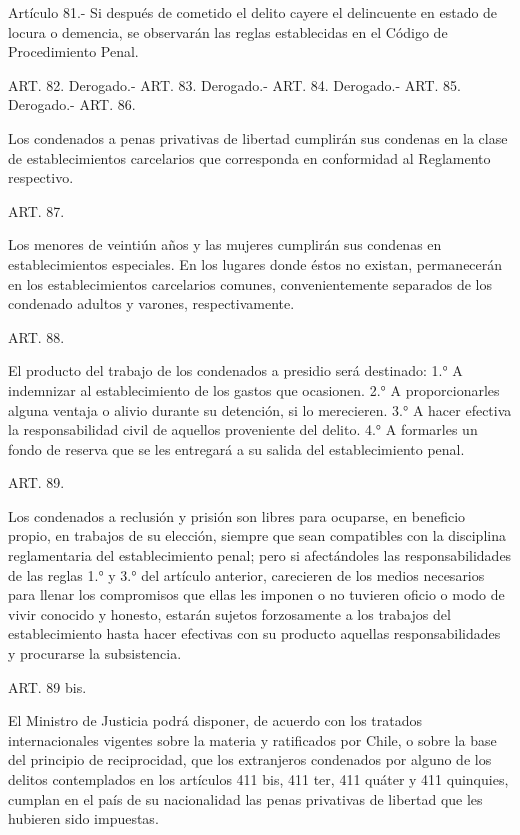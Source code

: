     Artículo 81.- Si después de cometido el delito cayere el delincuente en estado de locura o demencia, se observarán las reglas establecidas en el Código de Procedimiento Penal.



    ART. 82. Derogado.-
    ART. 83. Derogado.-
    ART. 84. Derogado.-
    ART. 85. Derogado.-
    ART. 86.

    Los condenados a penas privativas de libertad cumplirán sus condenas en la clase de establecimientos carcelarios que corresponda en conformidad al Reglamento respectivo.

    ART. 87.

    Los menores de veintiún años y las mujeres cumplirán sus condenas en establecimientos especiales. En los lugares donde éstos no existan, permanecerán en los establecimientos carcelarios comunes, convenientemente separados de los condenado adultos y varones, respectivamente.



    ART. 88.

    El producto del trabajo de los condenados a presidio será destinado:
    1.° A indemnizar al establecimiento de los gastos que ocasionen.
    2.° A proporcionarles alguna ventaja o alivio durante su detención, si lo merecieren.
    3.° A hacer efectiva la responsabilidad civil de aquellos proveniente del delito.
    4.° A formarles un fondo de reserva que se les entregará a su salida del establecimiento penal.



    ART. 89.

    Los condenados a reclusión y prisión son libres para ocuparse, en beneficio propio, en trabajos de su elección, siempre que sean compatibles con la disciplina reglamentaria del establecimiento penal; pero si afectándoles las responsabilidades de las reglas 1.° y 3.° del artículo anterior, carecieren de los medios necesarios para llenar los compromisos que ellas les imponen o no tuvieren oficio o modo de vivir conocido y honesto, estarán sujetos forzosamente a los trabajos del establecimiento hasta hacer efectivas con su producto aquellas responsabilidades y procurarse la subsistencia.

    ART. 89 bis.

    El Ministro de Justicia podrá disponer, de acuerdo con los tratados internacionales vigentes sobre la materia y ratificados por Chile, o sobre la base del principio de reciprocidad, que los extranjeros condenados por alguno de los delitos contemplados en los artículos 411 bis, 411 ter, 411 quáter y 411 quinquies, cumplan en el país de su nacionalidad las penas privativas de libertad que les hubieren sido impuestas.   



